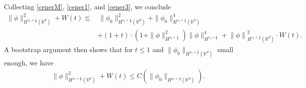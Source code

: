\documentclass[10pt,twoside,a4paper]{article}
\numberwithin{equation}{section}\allowdisplaybreaks
\def\leq{\leqslant}
\begin{document}
Collecting \eqref{cenerM}, \eqref{cener1}, and \eqref{cener3}, we conclude
\begin{align*}
	\|\phi\|_{H^{s_3+\frac12}(\mathbb{R}^{d})}^2+W(t) \lesssim &\,\|\phi_0\|_{H^{s_3+\frac12}(\mathbb{R}^{d})}^2+  \|\phi_0\|^4_{H^{s_3+\frac 12}(\mathbb{R}^{d})}
	\\
	&+( 1+t)\cdot\left(1+\|\phi\|_{H^{s_3+\frac 12}}^2\right)\|\phi\|_{H^{s_3+\frac 12}}^4+\left\|  \phi\right\|_{H^{s_3+\frac 12}(\mathbb{R}^d)}^2 \cdot W (t).\nonumber
\end{align*}
A bootstrap argument then shows that for $ t\leq 1 $ and $ \|\phi_0\|_{H^{s_3+\frac12}(\mathbb{R}^{d})} $	 small enough, we have
\begin{align*} 
	\|\phi\|_{H^{s_3+\frac12}(\mathbb{R}^{d})}^2+	W(t) \leq C\left(\|\phi_0\|_{H^{s_3+\frac12}(\mathbb{R}^{d})}\right).
\end{align*}




\end{document}
